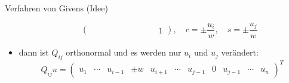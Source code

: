 \begin{bonus}{Verfahren von Givens (Idee)}
\begin{itemize}
\begin{itemize}
\[\begin{pmatrix}
                                  &        &   &    &   &        &   &   &   &        & 1
                            \end{pmatrix},
                            \quad
                            c = \pm \frac{u_i}{w},
                            \quad
                            s = \pm \frac{u_j}{w}
                        \]
              \end{itemize}
        \item dann ist $Q_{ij}$ orthonormal und es werden nur $u_i$ und $u_j$ verändert:
              \[
                  Q_{ij}u =
                  \begin{pmatrix}
                      u_1 & \cdots & u_{i-1} & \pm w & u_{i+1} & \cdots & u_{j-1} & 0 & u_{j-1} & \cdots & u_{n}
                  \end{pmatrix}^T
              \]
    \end{itemize}
\end{bonus}

